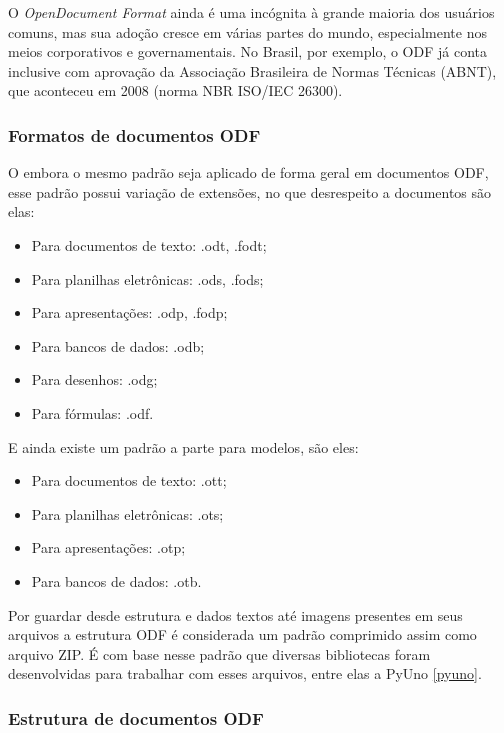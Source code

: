 \begin{citacao}
O \textit{OpenDocument Format} ainda é uma incógnita à grande maioria dos usuários comuns, mas sua adoção cresce em várias partes do mundo, especialmente nos meios corporativos e governamentais. No Brasil, por exemplo, o ODF já conta inclusive com aprovação da Associação Brasileira de Normas Técnicas (ABNT), que aconteceu em 2008 (norma NBR ISO/IEC 26300)\cite{ALECRIM-ODF}.
\end{citacao}

\subsubsection{Formatos de documentos ODF}

O embora o mesmo padrão seja aplicado de forma geral em documentos ODF, esse padrão possui variação de extensões, no que desrespeito a documentos são elas:

\begin{itemize}
    \item{Para documentos de texto: .odt, .fodt;}
    \item{Para planilhas eletrônicas: .ods, .fods;}
    \item{Para apresentações: .odp, .fodp;}
    \item{Para bancos de dados: .odb;}
    \item{Para desenhos: .odg;}
    \item{Para fórmulas: .odf.}
\end{itemize}

E ainda existe um padrão a parte para modelos, são eles:

\begin{itemize}
    \item{Para documentos de texto: .ott;}
    \item{Para planilhas eletrônicas: .ots;}
    \item{Para apresentações: .otp;}
    \item{Para bancos de dados: .otb.}
\end{itemize}

Por guardar desde estrutura e dados textos até imagens presentes em seus arquivos a estrutura ODF é considerada um padrão comprimido assim como arquivo ZIP. É com base nesse padrão que diversas bibliotecas foram desenvolvidas para trabalhar com esses arquivos, entre elas a PyUno \ref{pyuno}.

\subsubsection{Estrutura de documentos ODF}

